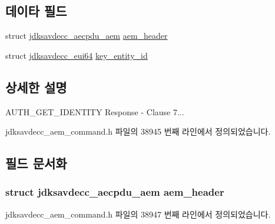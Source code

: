 \subsection*{데이타 필드}
\begin{DoxyCompactItemize}
\item 
struct \hyperlink{structjdksavdecc__aecpdu__aem}{jdksavdecc\+\_\+aecpdu\+\_\+aem} \hyperlink{structjdksavdecc__aem__command__auth__get__identity__response_ae1e77ccb75ff5021ad923221eab38294}{aem\+\_\+header}
\item 
struct \hyperlink{structjdksavdecc__eui64}{jdksavdecc\+\_\+eui64} \hyperlink{structjdksavdecc__aem__command__auth__get__identity__response_a1d00b892b0a7ee20cc6db265b49c322b}{key\+\_\+entity\+\_\+id}
\end{DoxyCompactItemize}


\subsection{상세한 설명}
A\+U\+T\+H\+\_\+\+G\+E\+T\+\_\+\+I\+D\+E\+N\+T\+I\+TY Response -\/ Clause 7... 

jdksavdecc\+\_\+aem\+\_\+command.\+h 파일의 38945 번째 라인에서 정의되었습니다.



\subsection{필드 문서화}
\subsubsection[{\texorpdfstring{aem\+\_\+header}{aem_header}}]{\setlength{\rightskip}{0pt plus 5cm}struct {\bf jdksavdecc\+\_\+aecpdu\+\_\+aem} aem\+\_\+header}\hypertarget{structjdksavdecc__aem__command__auth__get__identity__response_ae1e77ccb75ff5021ad923221eab38294}{}\label{structjdksavdecc__aem__command__auth__get__identity__response_ae1e77ccb75ff5021ad923221eab38294}


jdksavdecc\+\_\+aem\+\_\+command.\+h 파일의 38947 번째 라인에서 정의되었습니다.

